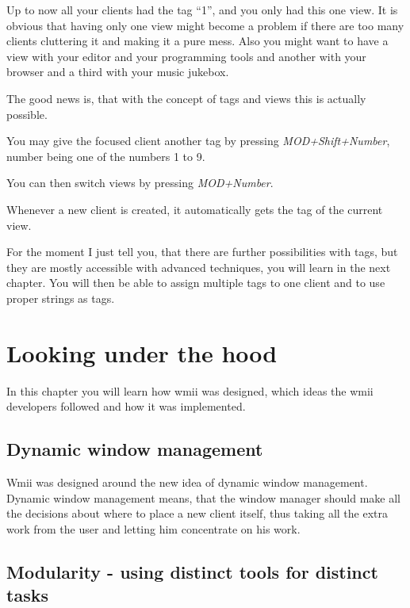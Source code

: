 \documentclass[12pt,a4paper]{article}
\begin{document}
    Up to now all your clients had the tag ``1'', and you only had
    this one view. It is obvious that having only one view might
    become a problem if there are too many clients cluttering it and
    making it a pure mess. Also you might want to have a view with
    your editor and your programming tools and another with your
    browser and a third with your music jukebox.

    The good news is, that with the concept of tags and views this is
    actually possible.

    You may give the focused client another tag by pressing
    \emph{MOD+Shift+Number}, number being one of the numbers 1 to 9.

    You can then switch views by pressing \emph{MOD+Number}.

    Whenever a new client is created, it automatically gets the tag of
    the current view.


    For the moment I just tell you, that there are further
    possibilities with tags, but they are mostly accessible with
    advanced techniques, you will learn in the next chapter. You will
    then be able to assign multiple tags to one client and to use
    proper strings as tags.

\section{Looking under the hood}

  In this chapter you will learn how wmii was designed, which ideas
  the wmii developers followed and how it was implemented.

  \subsection{Dynamic window management}

    Wmii was designed around the new idea of dynamic window
    management. Dynamic window management means, that the window
    manager should make all the decisions about where to place a new
    client itself, thus taking all the extra work from the user and
    letting him concentrate on his work.

  \subsection{Modularity - using distinct tools for distinct tasks}
\end{document}
